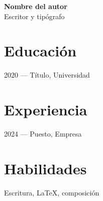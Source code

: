 \documentclass[11pt]{article}
\begin{document}
{\Large\bfseries Nombre del autor}\\[4pt]
{\large Escritor y tipógrafo}

\vspace{8pt}

\section*{Educación}
2020 — Título, Universidad

\section*{Experiencia}
2024 — Puesto, Empresa

\section*{Habilidades}
Escritura, LaTeX, composición
\end{document}
